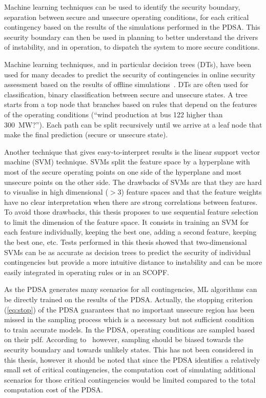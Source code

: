 Machine learning techniques can be used to identify the security boundary, \ie separation between secure and unsecure operating conditions, for each critical contingency based on the results of the simulations performed in the PDSA. This security boundary can then be used in planning to better understand the drivers of instability, and in operation, to dispatch the system to more secure conditions.

Machine learning techniques, and in particular decision trees (DTs), have been used for many decades to predict the security of contingencies in online security assessment based on the results of offline simulations~\cite{DT_Wehenkel}. DTs are often used for classification, \eg binary classification between secure and unsecure states. A tree starts from a top node that branches based on rules that depend on the features of the operating conditions (\eg ``wind production at bus 122 higher than 300~MW?''). Each path can be split recursively until we arrive at a leaf node that make the final prediction (\eg secure or unsecure state).

Another technique that gives easy-to-interpret results is the linear support vector machine (SVM) technique. SVMs split the feature space by a hyperplane with most of the secure operating points on one side of the hyperplane and most unsecure points on the other side. The drawbacks of SVMs are that they are hard to visualise in high dimensional (\(>3\)) feature spaces and that the feature weights have no clear interpretation when there are strong correlations between features. To avoid those drawbacks, this thesis proposes to use sequential feature selection to limit the dimension of the feature space. It consists in training an SVM for each feature individually, keeping the best one, adding a second feature, keeping the best one, etc. Tests performed in this thesis showed that two-dimensional SVMs can be as accurate as decision trees to predict the security of individual contingencies but provide a more intuitive distance to instability and can be more easily integrated in operating rules or in an SCOPF.

As the PDSA generates many scenarios for all contingencies, ML algorithms can be directly trained on the results of the PDSA. Actually, the stopping criterion (\ref{eq:stop}) of the PDSA guarantees that no important unsecure region has been missed in the sampling process which is a necessary but not sufficient condition to train accurate models. In the PDSA, operating conditions are sampled based on their pdf. According to~\cite{Bugaje} however, sampling should be biased towards the security boundary and towards unlikely states. This has not been considered in this thesis, however it should be noted that since the PDSA identifies a relatively small set of critical contingencies, the computation cost of simulating additional scenarios for those critical contingencies would be limited compared to the total computation cost of the PDSA.

